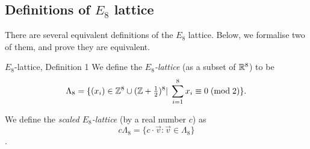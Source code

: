 \subsection{Definitions of $E_8$ lattice}

There are several equivalent definitions of the $E_8$ lattice. Below, we formalise two of them, and prove they are equivalent.

\begin{definition}{$E_8$-lattice, Definition 1}\label{E8-Set}\leanok
  We define the \emph{$E_8$-lattice} (as a subset of $\mathbb{R}^8$) to be
$$\Lambda_8=\{(x_i)\in\mathbb{Z}^8\cup(\mathbb{Z}+\textstyle\frac12\displaystyle )^8|\;\sum_{i=1}^8x_i\equiv 0\;(\mathrm{mod\;2})\}.$$
\end{definition}

\begin{definition}\label{E8-Scaled-Set}\leanok
  We define the \emph{scaled $E_8$-lattice} (by a real number $c$) as $$c\Lambda_8 = \{c \cdot \vec{v} : \vec{v} \in \Lambda_8\}$$.
\end{definition}

